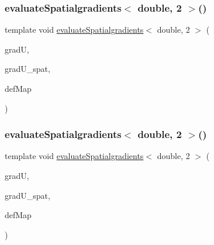 \mbox{\label{function_evaluations_8cc_a8f2e81f6aec814594a6ce54d2a8634f4}} 
\subsubsection{\texorpdfstring{evaluateSpatialgradients$<$ double, 2 $>$()}{evaluateSpatialgradients< double, 2 >()}\hspace{0.1cm}{\footnotesize\ttfamily [1/2]}}
{\footnotesize\ttfamily template void \mbox{\hyperlink{group___evaluation_functions_ga0b976342d491f6215953e2e65ea6a0de}{evaluate\+Spatialgradients}}$<$ double, 2 $>$ (\begin{DoxyParamCaption}\item[{Table$<$ 2, double $>$ \&}]{gradU,  }\item[{Table$<$ 2, double $>$}]{grad\+U\+\_\+spat,  }\item[{\mbox{\hyperlink{structdeformation_map}{deformation\+Map}}$<$ double, 2 $>$ \&}]{def\+Map }\end{DoxyParamCaption})}

\mbox{\label{function_evaluations_8cc_a3f479e2f2e28603def984ea4c2e02ad9}} 
\subsubsection{\texorpdfstring{evaluateSpatialgradients$<$ double, 2 $>$()}{evaluateSpatialgradients< double, 2 >()}\hspace{0.1cm}{\footnotesize\ttfamily [2/2]}}
{\footnotesize\ttfamily template void \mbox{\hyperlink{group___evaluation_functions_ga0b976342d491f6215953e2e65ea6a0de}{evaluate\+Spatialgradients}}$<$ double, 2 $>$ (\begin{DoxyParamCaption}\item[{Table$<$ 3, double $>$ \&}]{gradU,  }\item[{Table$<$ 3, double $>$}]{grad\+U\+\_\+spat,  }\item[{\mbox{\hyperlink{structdeformation_map}{deformation\+Map}}$<$ double, 2 $>$ \&}]{def\+Map }\end{DoxyParamCaption})}

